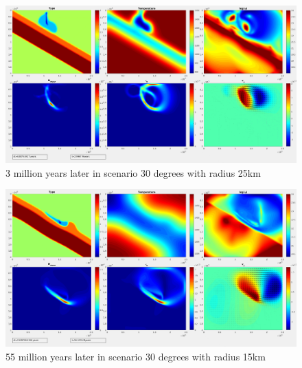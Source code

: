 \documentclass[12pt]{scrreprt}
\begin{document}
\begin{figure}
\begin{minipage}[t]{1.0\textwidth}
\includegraphics[width=1.0\textwidth]{./Snapshots/ref/Subductionzonewithblobpos1slab30s1e7r25.jpg}
\end{minipage}
\caption{3 million years later in scenario 30 degrees with radius 25km}
\label{fig:3m3025km}
\end{figure}
\begin{figure}
\begin{minipage}[t]{1.0\textwidth}
\includegraphics[width=1.0\textwidth]{./Snapshots/ref/Subductionzonewithblobpos1slab30s1e7r15.jpg}
\end{minipage}
\caption{55 million years later in scenario 30 degrees with radius 15km}
\label{fig:55m3015km}
\end{figure}

\end{document}
